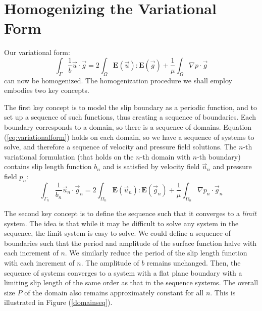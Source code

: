 \documentclass[12pt, a4paper, twoside, openright]{book}
\begin{document}
\clearpage
\section{Homogenizing the Variational Form}

Our variational form:
\begin{equation}
\int_{\Gamma} \frac{1}{b} \vec{u} \cdot \vec{g} = 
2 \int_{\Omega} \mathbf{E}(\vec{u}) : \mathbf{E}(\vec{g}) +
\frac{1}{\mu} \int_{\Omega}  \nabla p \cdot \vec{g}
\label{eq:variationalform}
\end{equation}
can now be homogenized.  The homogenization procedure we shall employ embodies two key concepts.

The first key concept is to model the slip boundary as a periodic function, and to set up a sequence of such functions, thus creating a sequence of boundaries.
Each boundary corresponds to a domain, so there is a sequence of domains.  Equation (\ref{eq:variationalform}) holds on each domain, so we have a sequence of systems to solve, and therefore a sequence of velocity and pressure field solutions.
The $n$-th variational formulation (that holds on the $n$-th domain with $n$-th boundary) contains slip length function $b_n$ and is satisfied by velocity field $\vec{u}_n$ and pressure field $p_n$:
\begin{equation}
\int_{\Gamma_n} \frac{1}{b_n} \vec{u}_n \cdot \vec{g}_n = 
2 \int_{\Omega_n} \mathbf{E}(\vec{u}_n) : \mathbf{E}(\vec{g}_n) +
\frac{1}{\mu} \int_{\Omega_n}  \nabla p_n \cdot \vec{g}_n
\label{eq:nthvariationalform}
\end{equation}

The second key concept is to define the sequence such that it converges to a \emph{limit} system.  The idea is that while it may be difficult to solve any system in the sequence, the limit system is easy to solve.  We could define a sequence of boundaries such that the period and amplitude of the surface function halve with each increment of $n$.  We similarly reduce the period of the slip length function with each increment of $n$.  The amplitude of $b$ remains unchanged.  Then, the sequence of systems converges to a system with a flat plane boundary with a limiting slip length of the same order as that in the sequence systems.  The overall size $P$ of the domain also remains approximately constant for all $n$.  This is illustrated in Figure (\ref{domainseq}).
\end{document}
